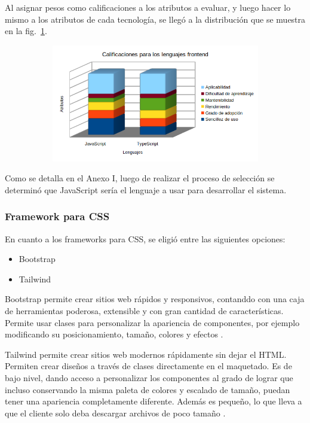 \documentclass{article}
\begin{document}
Al asignar pesos como calificaciones a los atributos a evaluar, y luego hacer lo mismo a los atributos de cada tecnología, se llegó a la distribución que se muestra en la fig.~\ref{fig:lenguajesFrontend}.
\begin{figure}[H]
	\caption{Calificaciones para lenguajes frontend}
    \begin{subfigure}{1\textwidth}
	\includegraphics[width=1\textwidth]{calificaciones para lenguajes frontend.png}
    \end{subfigure}
	\label{fig:lenguajesFrontend}
\end{figure}
\vspace{-1.0\baselineskip}
Como se detalla en el Anexo I, luego de realizar el proceso de selección se determinó que JavaScript sería el lenguaje a usar para desarrollar el sistema.
\subsubsection{Framework para CSS}
En cuanto a los frameworks para CSS, se eligió entre las siguientes opciones:
\begin{itemize}
    \item Bootstrap
    \item Tailwind
\end{itemize}

Bootstrap permite crear sitios web rápidos y responsivos, contanddo con una caja de herramientas poderosa, extensible y con gran cantidad de características. Permite usar clases para personalizar la apariencia de componentes, por ejemplo modificando su posicionamiento, tamaño, colores y efectos \parencite{bootstrapOfficial}.

Tailwind permite crear sitios web modernos rápidamente sin dejar el HTML. Permiten crear diseños a través de clases directamente en el maquetado. Es de bajo nivel, dando acceso a personalizar los componentes al grado de lograr que incluso conservando la misma paleta de colores y escalado de tamaño, puedan tener una apariencia completamente diferente. Además es pequeño, lo que lleva a que el cliente solo deba descargar archivos de poco tamaño \parencite{tailwindOfficial}.
\end{document}
